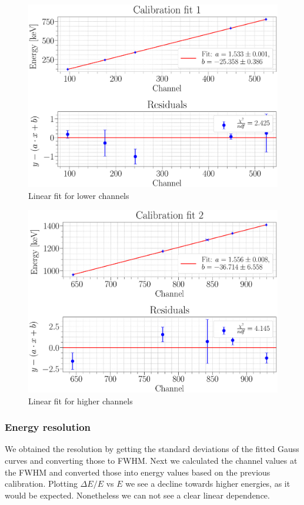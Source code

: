 \documentclass[a4paper,12pt]{article}
\begin{document}
\begin{figure}[H]
\centering
\includegraphics[scale=0.25]{../Figures/Calibration_fit_1.eps}
\caption{Linear fit for lower channels}
\label{calibFit1}
\end{figure}

\begin{figure}[H]
\centering
\includegraphics[scale=0.25]{../Figures/Calibration_fit_2.eps}
\caption{Linear fit for higher channels}
\label{calibFit2}
\end{figure}

\subsubsection{Energy resolution}
We obtained the resolution by getting the standard deviations of the fitted Gauss curves and converting those to FWHM. Next we calculated the channel values at the FWHM and converted those into energy values based on the previous calibration. Plotting $\Delta E/E$ vs $E$ we see a decline towards higher energies, as it would be expected. Nonetheless we can not see a clear linear dependence.
\end{document}
